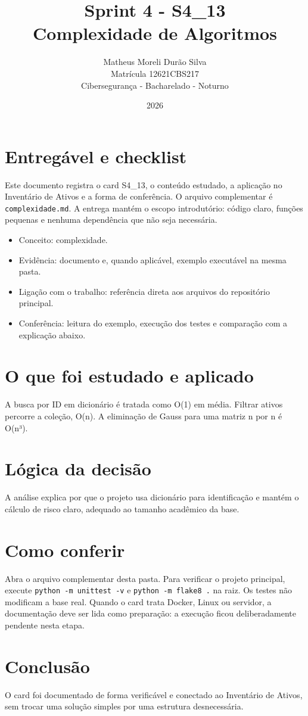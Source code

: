 \documentclass[12pt]{article}
\title{Sprint 4 - S4\_13\\Complexidade de Algoritmos}
\author{Matheus Moreli Durão Silva\\ Matrícula 12621CBS217\\ Cibersegurança - Bacharelado - Noturno}
\date{2026}
\begin{document}
\maketitle

\section*{Entregável e checklist}
Este documento registra o card S4\_13, o conteúdo estudado, a aplicação no Inventário de Ativos e a forma de conferência. O arquivo complementar é \texttt{complexidade.md}. A entrega mantém o escopo introdutório: código claro, funções pequenas e nenhuma dependência que não seja necessária.

\begin{itemize}
\item Conceito: complexidade.
\item Evidência: documento e, quando aplicável, exemplo executável na mesma pasta.
\item Ligação com o trabalho: referência direta aos arquivos do repositório principal.
\item Conferência: leitura do exemplo, execução dos testes e comparação com a explicação abaixo.
\end{itemize}

\section*{O que foi estudado e aplicado}
A busca por ID em dicionário é tratada como O(1) em média. Filtrar ativos percorre a coleção, O(n). A eliminação de Gauss para uma matriz n por n é O(n³).

\section*{Lógica da decisão}
A análise explica por que o projeto usa dicionário para identificação e mantém o cálculo de risco claro, adequado ao tamanho acadêmico da base.

\section*{Como conferir}
Abra o arquivo complementar desta pasta. Para verificar o projeto principal, execute \texttt{python -m unittest -v} e \texttt{python -m flake8 .} na raiz. Os testes não modificam a base real. Quando o card trata Docker, Linux ou servidor, a documentação deve ser lida como preparação: a execução ficou deliberadamente pendente nesta etapa.

\section*{Conclusão}
O card foi documentado de forma verificável e conectado ao Inventário de Ativos, sem trocar uma solução simples por uma estrutura desnecessária.
\end{document}
